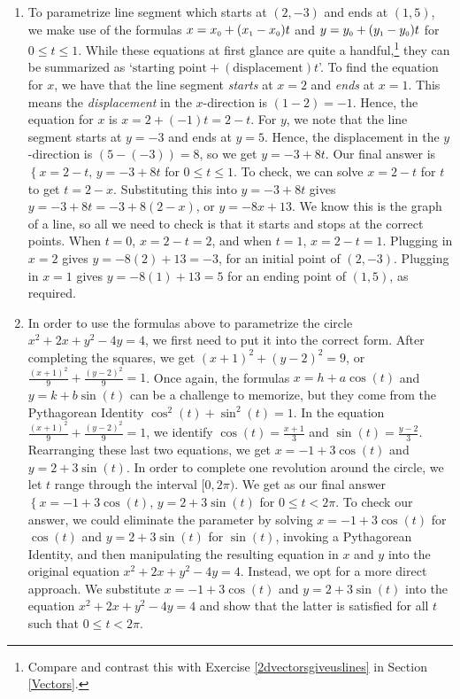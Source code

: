 \begin{ex}
\begin{enumerate}
\item  To parametrize line segment which starts at $(2,-3)$ and ends at $(1,5)$, we make use of the formulas $x = x_{\text{\tiny$0$}} + (x_{\text{\tiny$1$}} - x_{\text{\tiny$0$}}) t$ and $y = y_{\text{\tiny$0$}} + (y_{\text{\tiny$1$}} - y_{\text{\tiny$0$}}) t$ for $0 \leq t \leq 1$.    While these equations at first glance are quite a handful,\footnote{Compare and contrast this with Exercise \ref{2dvectorsgiveuslines} in Section \ref{Vectors}.} they can be summarized as `$\text{starting point} + (\text{displacement})t$'.  To find the equation for $x$, we have that the line segment \textit{starts} at $x= 2$ and \textit{ends} at $x = 1$.  This means the \textit{displacement} in the $x$-direction is $(1-2) = -1$.  Hence, the equation for $x$ is $x = 2 + (-1)t = 2-t$.  For $y$, we note that the line segment starts at $y=-3$ and ends at $y=5$.  Hence, the displacement in the $y$-direction is $(5-(-3)) = 8$, so we get $y = -3+8t$.  Our final answer is $\left\{ x = 2-t, \, y = -3+8t \right.$ for $0 \leq t \leq 1$.  To check, we can solve $x = 2-t$ for $t$ to get $t = 2-x$.  Substituting this into $y = -3+8t$ gives $y = -3+8t = -3+8(2-x)$, or $y = -8x+13$.  We know this is the graph of a line, so all we need to check is that it starts and stops at the correct points.  When $t=0$, $x= 2-t = 2$, and  when $t=1$, $x = 2-t = 1$.  Plugging in $x=2$ gives $y = -8(2)+13 = -3$, for an initial point of $(2,-3)$.  Plugging in $x = 1$ gives $y = -8(1)+13 = 5$ for an ending point of $(1,5)$, as required.

\item In order to use the formulas above to parametrize the circle $x^2 + 2x + y^2 - 4y = 4$, we first need to put it into the correct form.  After completing the squares, we get $(x+1)^2+(y-2)^2 = 9$, or $\frac{(x+1)^2}{9} + \frac{(y-2)^2}{9} = 1$.  Once again, the formulas $x = h+a\cos(t)$ and $y=k+b\sin(t)$ can be a challenge to memorize, but they come from the Pythagorean Identity $\cos^{2}(t) + \sin^{2}(t) = 1$.   In the equation $\frac{(x+1)^2}{9} + \frac{(y-2)^2}{9} = 1$, we identify $\cos(t) = \frac{x+1}{3}$ and $\sin(t) = \frac{y-2}{3}$.  Rearranging these last two equations, we get $x = -1+3 \cos(t)$ and $y = 2 +3 \sin(t)$.   In order to complete one revolution around the circle, we let $t$ range through the interval $[0,2\pi)$.  We get as our final answer $\left\{ x = -1+3 \cos(t), \, y = 2 +3 \sin(t) \right.$ for $0 \leq t < 2\pi$.  To check our answer, we could eliminate the parameter by solving  $x = -1+3\cos(t)$ for $\cos(t)$ and $y = 2+3\sin(t)$ for $\sin(t)$, invoking a Pythagorean Identity, and then manipulating the resulting equation in $x$ and $y$ into the original equation  $x^2+2x+y^2-4y = 4$.  Instead, we opt for a more direct approach.  We substitute $x = -1+3\cos(t)$ and $y = 2+3\sin(t)$ into the equation $x^2 + 2x + y^2 - 4y = 4$ and show that the latter is satisfied for all $t$ such that $0 \leq t < 2\pi$.


\end{enumerate}
\end{ex}
